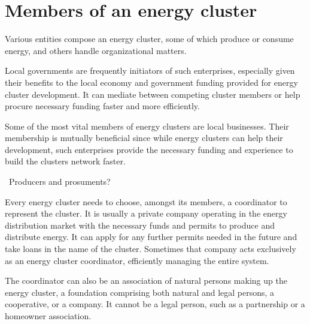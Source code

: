 \section{Members of an energy cluster}

\par Various entities compose an energy cluster, some of which produce or consume energy, and others handle organizational matters. 
\par Local governments are frequently initiators of such enterprises, especially given their benefits to the local economy and government funding provided for energy cluster development. It can mediate between competing cluster members or help procure necessary funding faster and more efficiently.
\par Some of the most vital members of energy clusters are local businesses. Their membership is mutually beneficial since while energy clusters can help their development, such enterprises provide the necessary funding and experience to build the clusters network faster.
\par ~Producers and prosuments?
\par Every energy cluster needs to choose, amongst its members, a coordinator to represent the cluster. It is usually a private company operating in the energy distribution market with the necessary funds and permits to produce and distribute energy. It can apply for any further permits needed in the future and take loans in the name of the cluster. Sometimes that company acts exclusively as an energy cluster coordinator, efficiently managing the entire system.
\par The coordinator can also be an association of natural persons making up the energy cluster, a foundation comprising both natural and legal persons, a cooperative, or a company. It cannot be a legal person, such as a partnership or a homeowner association.